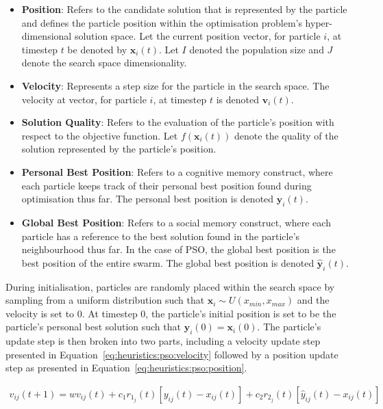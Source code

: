 \begin{itemize}
      \item \textbf{Position}: Refers to the candidate solution that is represented by the particle and defines the particle position within the optimisation problem's hyper-dimensional solution space. Let the current position vector, for particle $i$, at timestep $t$ be denoted by $\boldsymbol{x}_{i}(t)$. Let $I$ denoted the population size and $J$ denote the search space dimensionality.

      \item \textbf{Velocity}: Represents a step size for the particle in the search space. The velocity at vector, for particle $i$, at timestep $t$ is denoted $\boldsymbol{v}_{i}(t)$.

      \item \textbf{Solution Quality}: Refers to the evaluation of the particle's position with respect to the objective function. Let $f(\boldsymbol{x}_{i}(t))$ denote the quality of the solution represented by the particle's position.

      \item \textbf{Personal Best Position}: Refers to a cognitive memory construct, where each particle keeps track of their personal best position found during optimisation thus far. The personal best position is denoted $\boldsymbol{y}_{i}(t)$.

      \item \textbf{Global Best Position}: Refers to a social memory construct, where each particle has a reference to the best solution found in the particle's neighbourhood thus far. In the case of  \acs{PSO}, the global best position is the best position of the entire swarm. The global best position is denoted $\boldsymbol{\hat{y}}_{i}(t)$.
\end{itemize}

During initialisation, particles are randomly placed within the search space by sampling from a uniform distribution such that $\boldsymbol{x}_{i} \sim U(x_{min}, x_{max})$ and the velocity is set to 0. At timestep 0, the particle's initial position is set to be the particle's personal best solution such that $\boldsymbol{y}_{i}(0) = \boldsymbol{x}_{i}(0)$. The particle's update step is then broken into two parts, including a velocity update step presented in Equation~\eqref{eq:heuristics:pso:velocity} followed by a position update step as presented in Equation~\eqref{eq:heuristics:pso:position}.

\begin{equation}
      \label{eq:heuristics:pso:velocity}
      \begin{split}
            v_{ij}(t+1) = wv_{ij}(t) + c_{1}r_{1_{j}}(t)[y_{ij}(t) - x_{ij}(t)] + c_{2}r_{2_{j}}(t)[\hat{y}_{ij}(t) - x_{ij}(t)]
      \end{split}
\end{equation}


